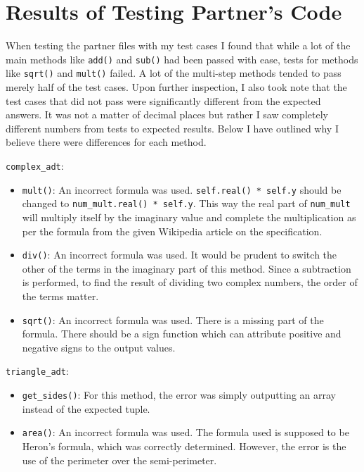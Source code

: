 \documentclass[12pt]{article}
\begin{document}
\section{Results of Testing Partner's Code}

When testing the partner files with my test cases I found that while a lot of the main
methods like \verb|add()| and \verb|sub()| had been passed with ease, tests for methods like 
\verb|sqrt()| and \verb|mult()| failed. A lot of the multi-step methods tended to pass
merely half of the test cases. Upon further inspection, I also took note that the test
cases that did not pass were significantly different from the expected answers. It was not
a matter of decimal places but rather I saw completely different numbers from tests to expected
results. Below I have outlined why I believe there were differences for each method.\newline

\verb|complex_adt|:
\begin{itemize}
	\item \verb|mult()|: An incorrect formula was used. 
	\verb|self.real() * self.y| should be changed 
	to \verb|num_mult.real() * self.y|. This way
	the real part of \verb|num_mult| will multiply itself by the imaginary value and complete the multiplication as per the formula from the given Wikipedia article on the specification.
	\item \verb|div()|: An incorrect formula was used. 
	It would be prudent to switch the other of the terms in the imaginary part of this method. Since a subtraction is performed, to find the result of dividing two complex numbers, the order of the terms matter.
	\item \verb|sqrt()|: An incorrect formula was used. 
	There is a missing part of the formula. There should be a sign function which can attribute
	positive and negative signs to the output values. 
\end{itemize}	
	
\verb|triangle_adt|:
\begin{itemize}
	\item \verb|get_sides()|: For this method, the error was simply outputting an array instead of the expected tuple. 
	\item \verb|area()|: An incorrect formula was used. 
	The formula used is supposed to be Heron's formula, which was correctly determined. However, the error is the use of the perimeter over the semi-perimeter.

\end{itemize}
\end{document}
